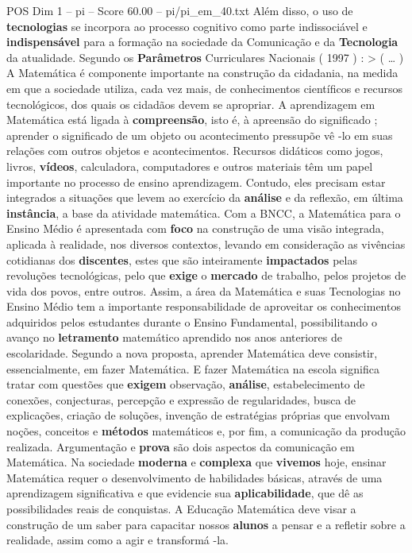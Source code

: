 \begin{textsample}{POS Dim 1 – pi – Score 60.00 – pi/pi\_em\_40.txt}
Além disso, o uso de \textbf{tecnologias} se incorpora ao processo cognitivo como parte indissociável e \textbf{indispensável} para a formação na sociedade da Comunicação e da \textbf{Tecnologia} da atualidade.
Segundo os \textbf{Parâmetros} Curriculares Nacionais ( 1997 ) : > ( … ) A Matemática é componente importante na construção da cidadania, na medida em que a sociedade utiliza, cada vez mais, de conhecimentos científicos e recursos tecnológicos, dos quais os cidadãos devem se apropriar.
A aprendizagem em Matemática está ligada à \textbf{compreensão}, isto é, à apreensão do significado ; aprender o significado de um objeto ou acontecimento pressupõe vê -lo em suas relações com outros objetos e acontecimentos.
Recursos didáticos como jogos, livros, \textbf{vídeos}, calculadora, computadores e outros materiais têm um papel importante no processo de ensino aprendizagem.
Contudo, eles precisam estar integrados a situações que levem ao exercício da \textbf{análise} e da reflexão, em última \textbf{instância}, a base da atividade matemática.
Com a BNCC, a Matemática para o Ensino Médio é apresentada com \textbf{foco} na construção de uma visão integrada, aplicada à realidade, nos diversos contextos, levando em consideração as vivências cotidianas dos \textbf{discentes}, estes que são inteiramente \textbf{impactados} pelas revoluções tecnológicas, pelo que \textbf{exige} o \textbf{mercado} de trabalho, pelos projetos de vida dos povos, entre outros.
Assim, a área da Matemática e suas Tecnologias no Ensino Médio tem a importante responsabilidade de aproveitar os conhecimentos adquiridos pelos estudantes durante o Ensino Fundamental, possibilitando o avanço no \textbf{letramento} matemático aprendido nos anos anteriores de escolaridade.
Segundo a nova proposta, aprender Matemática deve consistir, essencialmente, em fazer Matemática.
E fazer Matemática na escola significa tratar com questões que \textbf{exigem} observação, \textbf{análise}, estabelecimento de conexões, conjecturas, percepção e expressão de regularidades, busca de explicações, criação de soluções, invenção de estratégias próprias que envolvam noções, conceitos e \textbf{métodos} matemáticos e, por fim, a comunicação da produção realizada.
Argumentação e \textbf{prova} são dois aspectos da comunicação em Matemática.
Na sociedade \textbf{moderna} e \textbf{complexa} que \textbf{vivemos} hoje, ensinar Matemática requer o desenvolvimento de habilidades básicas, através de uma aprendizagem significativa e que evidencie sua \textbf{aplicabilidade}, que dê as possibilidades reais de conquistas.
A Educação Matemática deve visar a construção de um saber para capacitar nossos \textbf{alunos} a pensar e a refletir sobre a realidade, assim como a agir e transformá -la.

\end{textsample}
